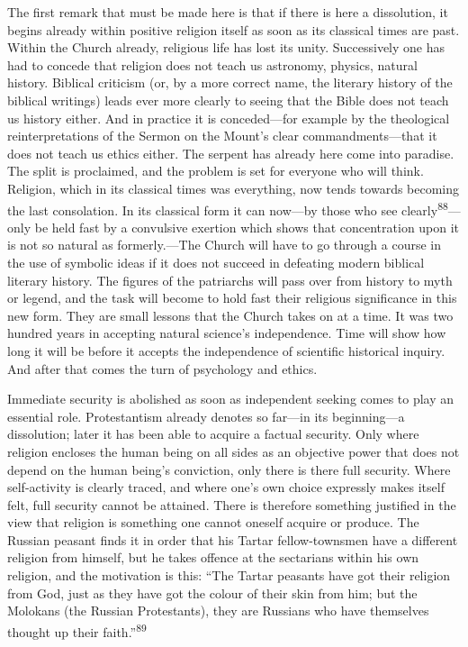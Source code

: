 \documentclass[12pt,a4paper]{book}
\newcommand{\opage}[1]{\marginnote{\footnotesize\textit{[#1]}}}
\begin{document}
The first remark that must be made here is that if there is here a dissolution, it begins already within
positive religion itself as soon as its classical times are past. Within the Church already, religious life
has lost its unity. Successively one has had to concede that religion does not teach us astronomy, physics,
natural history. Biblical criticism (or, by a more correct name, the literary history of the biblical
writings) leads ever more clearly to seeing that the Bible does not teach us history either. And in practice
it is conceded---for example by the theological reinterpretations of the Sermon on the Mount's clear
commandments---that it does not teach us ethics either. The serpent has already here come into paradise. The
split is proclaimed, and the problem is set for everyone who will think. Religion, which in its classical
times was everything, now tends towards becoming the last consolation. In its classical form it can
now---by those who see clearly\textsuperscript{88}---only be held fast by a convulsive exertion which shows
that concentration upon it is not so natural as formerly.---The Church will have to go through a course in
the use of symbolic ideas if it does not succeed in defeating modern biblical literary history. The figures of
the patriarchs 
\opage{187}will pass over from history to myth or legend, and the task will become to hold fast their
religious significance in this new form. They are small lessons that the Church takes on at a time. It was two
hundred years in accepting natural science's independence. Time will show how long it will be before it
accepts the independence of scientific historical inquiry. And after that comes the turn of psychology and
ethics.

Immediate security is abolished as soon as independent seeking comes to play an essential role. Protestantism
already denotes so far---in its beginning---a dissolution; later it has been able to acquire a factual
security. Only where religion encloses the human being on all sides as an objective power that does not depend
on the human being's conviction, only there is there full security. Where self-activity is clearly traced, and
where one's own choice expressly makes itself felt, full security cannot be attained. There is therefore
something justified in the view that religion is something one cannot oneself acquire or produce. The Russian
peasant finds it in order that his Tartar fellow-townsmen have a different religion from himself, but he takes
offence at the sectarians within his own religion, and the motivation is this: ``The Tartar peasants have got
their religion from God, just as they have got the colour of their skin from him; but the Molokans (the Russian
Protestants), they are Russians who have themselves thought up their faith.''\textsuperscript{89}
\end{document}
